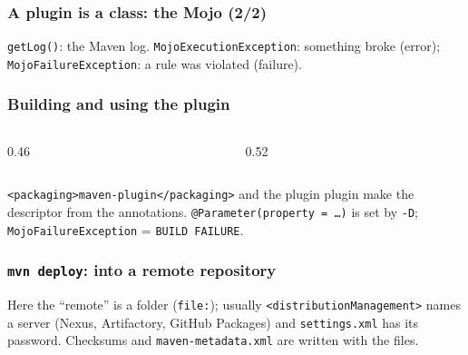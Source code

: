 \documentclass[aspectratio=169,10pt,compress]{beamer}
\begin{document}
\begin{frame}[t,fragile] \frametitle{A plugin is a class: the Mojo (2/2)}

  \vspace{0.1em}
  \small \texttt{getLog()}: the Maven log. \texttt{MojoExecutionException}: something broke (error); \texttt{MojoFailureException}: a rule was violated (failure).
\end{frame}




\begin{frame}[t,fragile] \frametitle{Building and using the plugin}
  \begin{columns}[T]
    \begin{column}{0.46\textwidth}
    \end{column}
    \begin{column}{0.52\textwidth}
    \end{column}
  \end{columns}
  \vspace{0.2em}
  \small \texttt{<packaging>maven-plugin</packaging>} and the plugin plugin make the descriptor from the annotations. \texttt{@Parameter(property = \dots)} is set by \texttt{-D}; \texttt{MojoFailureException} = \texttt{BUILD FAILURE}.
\end{frame}





\begin{frame}[t,fragile] \frametitle{\texttt{mvn deploy}: into a remote repository}

  \vspace{0.1em}
  \small
  Here the ``remote'' is a folder (\texttt{file:}); usually \texttt{<distributionManagement>} names a server (Nexus, Artifactory, GitHub Packages) and \texttt{settings.xml} has its password. Checksums and \texttt{maven-metadata.xml} are written with the files.
\end{frame}
\end{document}
